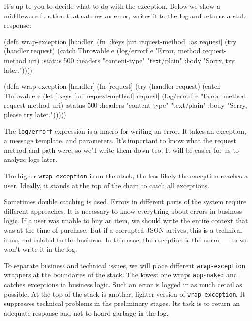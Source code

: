 It's up to you to decide what to do with the exception. Below we show a middleware function that catches an error, writes it to the log and returns a stub response:


\ifx\DEVICETYPE\MOBILE

\begin{clojure}
(defn wrap-exception [handler]
  (fn [{:keys [uri request-method]
        :as request}]
    (try
      (handler request)
      (catch Throwable e
        (log/errorf e
          "Error, method %
          request-method uri)
          {:status 500
           :headers
           {"content-type" "text/plain"}
           :body "Sorry, try later."}))))
\end{clojure}

\else

\begin{clojure}
(defn wrap-exception [handler]
  (fn [request]
    (try
      (handler request)
      (catch Throwable e
        (let [{:keys [uri request-method]} request]
          (log/errorf e "Error, method %
                      request-method uri)
          {:status 500
           :headers {"content-type" "text/plain"}
           :body "Sorry, please try later."})))))
\end{clojure}

\fi


The \verb|log/errorf| expression is a macro for writing an error. It takes an exception, a message template, and parameters. It's important to know what the request method and path were, so we'll write them down too. It will be easier for us to analyze logs later.

The higher \verb|wrap-exception| is on the stack, the less likely the exception reaches a user. Ideally, it stands at the top of the chain to catch all exceptions.

Sometimes double catching is used. Errors in different parts of the system require different approaches. It is necessary to know everything about errors in business logic. If a user was unable to buy an item, we should write the entire context that was at the time of purchase. But if a corrupted JSON arrives, this is a technical issue, not related to the business. In this case, the exception is the norm~--- so we won't write it in the log.

To separate business and technical issues, we will place different \verb|wrap-exception| wrappers at the boundaries of the stack. The lowest one wraps \verb|app-naked| and catches exceptions in business logic. Such an error is logged in as much detail as possible. At the top of the stack is another, lighter version of \verb|wrap-exception|.
It suppresses technical problems in the preliminary stages. Its task is to return an adequate response and not to hoard garbage in the log.

